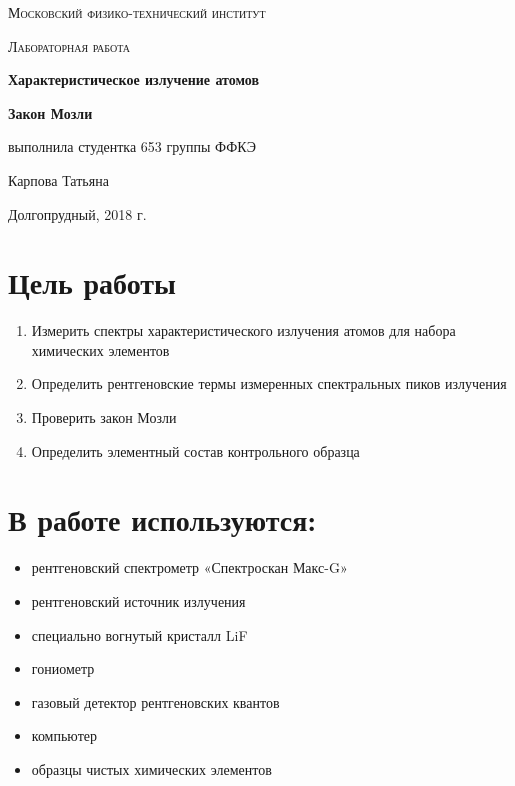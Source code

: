 \documentclass[a4paper]{article}
\begin{document}
\begin{titlepage}
	\centering
	\vspace{5cm}
	{\scshape\LARGE Московский физико-технический институт \par}
	\vspace{4cm}
	{\scshape\Large Лабораторная работа \par}
	\vspace{1cm}
	{\huge\bfseries Характеристическое излучение атомов \par}
	\vspace{0.5cm}
	{\huge\bfseries Закон Мозли \par}
	\vspace{1cm}
	\vfill
\begin{flushright}
	{\large выполнила студентка 653 группы ФФКЭ}\par
	\vspace{0.3cm}
	{\LARGE Карпова Татьяна} \par

\end{flushright}
	

	\vfill

	Долгопрудный, 2018 г.
\end{titlepage}

\section{Цель работы}
\begin{enumerate}
    \item  Измерить спектры характеристического излучения
атомов для набора химических элементов
    \item Определить рентгеновские
термы измеренных спектральных пиков излучения
    \item Проверить закон Мозли
    \item Определить элементный состав контрольного образца
\end{enumerate}

\section{В работе используются:}
\begin{itemize}
    \item рентгеновский спектрометр «Спектроскан
Макс-G»
    \item рентгеновский источник излучения
    \item специально вогнутый кристалл LiF
    \item гониометр
    \item газовый детектор рентгеновских
квантов
    \item компьютер
    \item образцы чистых химических
элементов
\end{itemize}
\end{document}
